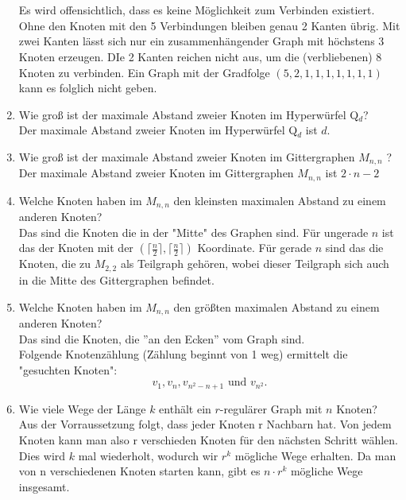 \begin{enumerate}[label=(\alph*)]
\\\\
        Es wird offensichtlich, dass es keine Möglichkeit zum Verbinden existiert. Ohne den Knoten mit 
        den 5 Verbindungen bleiben genau 2 Kanten übrig. Mit zwei Kanten lässt sich nur ein zusammenhängender Graph mit höchstens 3 Knoten erzeugen. DIe 2 Kanten reichen nicht aus, um die 
        (verbliebenen) 8 Knoten zu verbinden. Ein Graph mit der Gradfolge $(5,2,1,1,1,1,1,1,1)$ kann es 
        folglich nicht geben. 
         
        \item Wie groß ist der maximale Abstand zweier Knoten im Hyperwürfel Q$_d$? \\
        Der maximale Abstand zweier Knoten im Hyperwürfel Q$_d$ ist $d$.
        
        \item Wie groß ist der maximale Abstand zweier Knoten im Gittergraphen $M_{n,n}$ ? \\
        Der maximale Abstand zweier Knoten im Gittergraphen $M_{n,n}$ ist $2\cdot n - 2$
        
        \item Welche Knoten haben im $M_{n,n}$ den kleinsten maximalen Abstand zu einem anderen Knoten? \\
        Das sind die Knoten die in der "Mitte" des Graphen sind. Für ungerade $n$ ist das der Knoten mit der
        $(\big\lceil\frac{n}{2}\big\rceil,\big\lceil\frac{n}{2}\big\rceil)$ Koordinate. 
        Für gerade $n$ sind das die Knoten, die zu $M_{2,2}$ als Teilgraph gehören, wobei dieser Teilgraph 
        sich auch in die Mitte des Gittergraphen befindet.
        
        \item Welche Knoten haben im $M_{n,n}$ den größten maximalen Abstand zu einem anderen Knoten? \\
        Das sind die Knoten, die ''an den Ecken'' vom Graph sind. \\
        Folgende Knotenzählung (Zählung beginnt von 1 weg) ermittelt die "gesuchten Knoten":
        $$v_1, v_n, v_{n^2-n+1} \text{ und } v_{n^2}.$$
        
        \item Wie viele Wege der Länge $k$ enthält ein $r$-regulärer Graph mit $n$ Knoten? \\
        Aus der Vorraussetzung folgt, dass jeder Knoten r Nachbarn hat. Von jedem Knoten kann man also r verschieden Knoten für den nächsten Schritt wählen. Dies wird $k$ mal wiederholt, wodurch wir $r^k$ mögliche Wege erhalten. Da man von n verschiedenen Knoten starten kann, gibt es $n \cdot r^k$ mögliche Wege insgesamt.
        

\end{enumerate}
